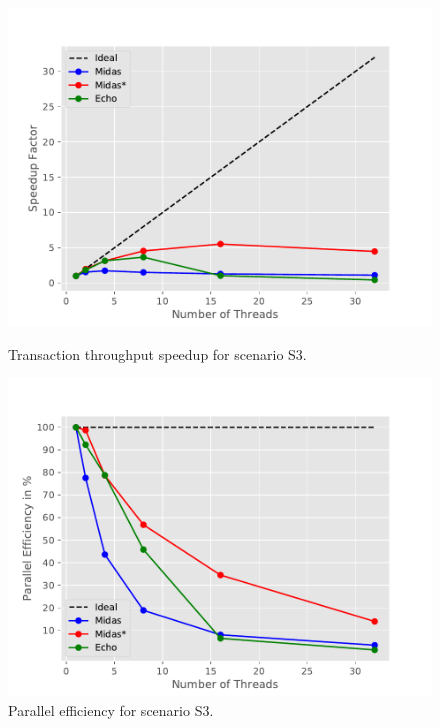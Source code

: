 \begin{figure}[h!]
\begin{minipage}[l]{0.50\textwidth}
    \includegraphics[width=\textwidth]{figures/bench/spd-ls}
    \caption{Transaction throughput speedup for scenario S3.}
    \label{fig:spd-s3}
\end{minipage}
\begin{minipage}[l]{0.50\textwidth}
    \includegraphics[width=\textwidth]{figures/bench/eff-ls}
    \caption{Parallel efficiency for scenario S3.}

\end{minipage}
\end{figure}

